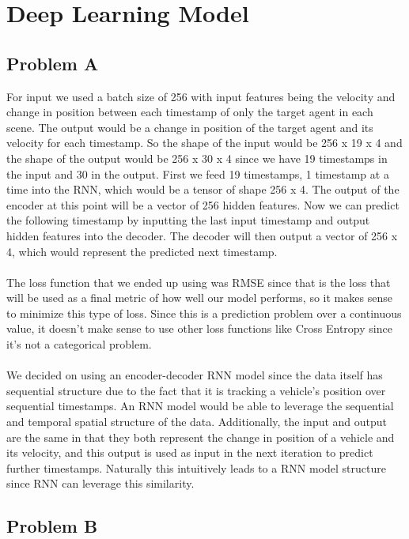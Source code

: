 \documentclass{article}
\begin{document}
\section{Deep Learning Model}
\label{gen_inst}
\subsection{Problem A}
For input we used a batch size of 256 with input features being the velocity and change in position between each timestamp of only the target agent in each scene. The output would be a change in position of the target agent and its velocity for each timestamp. So the shape of the input would be 256 x 19 x 4 and the shape of the output would be 256 x 30 x 4 since we have 19 timestamps in the input and 30 in the output. First we feed 19 timestamps, 1 timestamp at a time into the RNN, which would be a tensor of shape 256 x 4. The output of the encoder at this point will be a vector of 256 hidden features. Now we can predict the following timestamp by inputting the last input timestamp and output hidden features into the decoder. The decoder will then output a vector of 256 x 4, which would represent the predicted next timestamp.\\ \\
The loss function that we ended up using was RMSE since that is the loss that will be used as a final metric of how well our model performs, so it makes sense to minimize this type of loss. Since this is a prediction problem over a continuous value, it doesn't make sense to use other loss functions like Cross Entropy since it's not a categorical problem. \\ \\
We decided on using an encoder-decoder RNN model since the data itself has sequential structure due to the fact that it is tracking a vehicle's position over sequential timestamps. An RNN model would be able to leverage the sequential and temporal spatial structure of the data. Additionally, the input and output are the same in that they both represent the change in position of a vehicle and its velocity, and this output is used as input in the next iteration to predict further timestamps. Naturally this intuitively leads to a RNN model structure since RNN can leverage this similarity. 


\subsection{Problem B}
\end{document}
